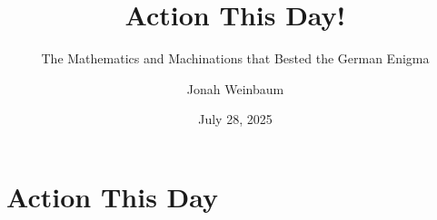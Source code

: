 \documentclass[hyphens,aspectratio=169]{beamer}
\title{Action This Day!}
\subtitle{The Mathematics and Machinations that Bested the German Enigma}
\author{Jonah Weinbaum}
\date{
July 28, 2025
}
\begin{document}
\frame{\titlepage}

\section{Action This Day}








\end{document}
